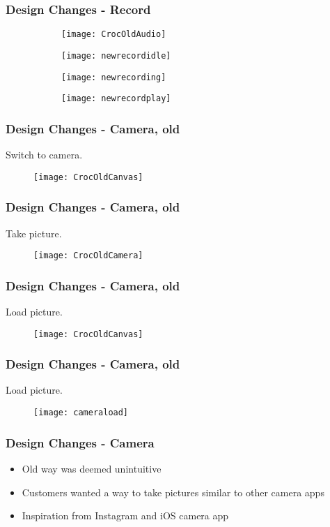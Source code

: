 \begin{frame}
	\frametitle{Design Changes - Record}
	\begin{figure}
	        \centering
	        \begin{subfigure}[b]{0.24\textwidth}
	                \texttt{[image: CrocOldAudio]}
	        \end{subfigure}%
	        \begin{subfigure}[b]{0.24\textwidth}
	                \texttt{[image: newrecordidle]}
	        \end{subfigure}
	        \begin{subfigure}[b]{0.24\textwidth}
	                \texttt{[image: newrecording]}
	        \end{subfigure}
 	        \begin{subfigure}[b]{0.24\textwidth}
 	                \texttt{[image: newrecordplay]}
 	        \end{subfigure}
	\end{figure}
\end{frame}

\begin{frame}
	\frametitle{Design Changes - Camera, old}
	Switch to camera.
		\begin{figure}
		\centering
			\texttt{[image: CrocOldCanvas]}
		\end{figure}
\end{frame}

\begin{frame}
	\frametitle{Design Changes - Camera, old}
	Take picture.
		\begin{figure}
		\centering
			\texttt{[image: CrocOldCamera]}
		\end{figure}
\end{frame}

\begin{frame}
	\frametitle{Design Changes - Camera, old}
	Load picture.
		\begin{figure}
		\centering
			\texttt{[image: CrocOldCanvas]}
		\end{figure}
\end{frame}

\begin{frame}
	\frametitle{Design Changes - Camera, old}
	Load picture.
		\begin{figure}
		\centering
			\texttt{[image: cameraload]}
		\end{figure}
\end{frame}
\begin{frame}
	\frametitle{Design Changes - Camera}
	\begin{itemize}
		\item Old way was deemed unintuitive
		\item Customers wanted a way to take pictures similar to other camera apps
		\item Inspiration from Instagram and iOS camera app
	\end{itemize}
\end{frame}

